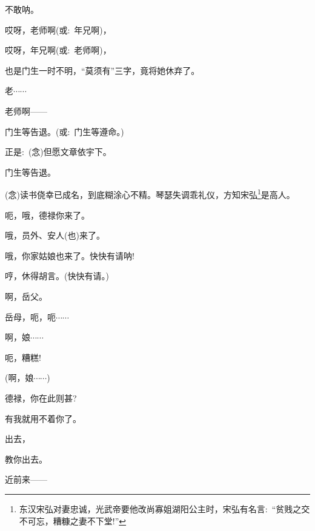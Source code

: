 {{不敢呐。}\hspace{30pt}~

{哎呀，老师啊({\akai 或}:~年兄啊)，}

{哎呀，年兄啊({\akai 或}:~老师啊)，}

{也是门生一时不明，``莫须有''三字，竟将她休弃了。}

{老$\cdots{}\cdots{}$}

{老师啊------}


{门生等告退。({\akai 或}:~门生等遵命。)}

{正是:~({\akai 念})但愿文章依宇下。}

{门生等告退。}\hspace{30pt}~

{\vspace{5pt}}


{({\akai 念})读书侥幸已成名，到底糊涂心不精。琴瑟失调乖礼仪，方知宋}弘\footnote{东汉宋弘对妻忠诚，光武帝要他改尚寡姐湖阳公主时，宋弘有名言:~``贫贱之交不可忘，糟糠之妻不下堂!''}{是高人。}

{呃，哦，德禄你来了。}\hspace{10pt}~

{哦，员外、安人(也)来了。}

{哦，你家姑娘也来了。快快有请呐!}

{哼，休得胡言。(快快有请。)}

{啊，岳父。}\hspace{30pt}~

{岳母，呃，呃$\cdots{}\cdots{}$}

{啊，娘$\cdots{}\cdots{}$}

{呃，糟糕!}\hspace{30pt}~

{(啊，娘$\cdots{}\cdots{}$)}

{德禄，你在此则甚?}

{有我就用不着你了。}

{出去，}\hspace{40pt}~

{教你出去。}\hspace{30pt}~

{近前来------}

}
